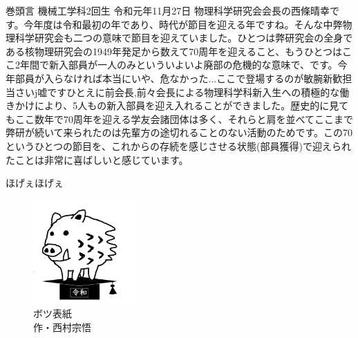 \documentclass[10pt,b5paper,papersize,dvipdfmx]{jsbook}
\begin{document}
\begin{preface}{巻頭言}
        {機械工学科2回生}
        {}
        {令和元年11月27日}
  物理科学研究会会長の西條晴幸です。今年度は令和最初の年であり、時代が節目を迎える年ですね。そんな中弊物理科学研究会も二つの意味で節目を迎えていました。ひとつは弊研究会の全身である核物理研究会の1949年発足から数えて70周年を迎えること、もうひとつはここ2年間で新入部員が一人のみといういよいよ廃部の危機的な意味で、です。今年部員が入らなければ本当にいや、危なかった...ここで登場するのが敏腕新歓担当さいj嘘ですひとえに前会長,前々会長による物理科学科新入生への積極的な働きかけにより、5人もの新入部員を迎え入れることができました。歴史的に見てもここ数年で70周年を迎える学友会諸団体は多く、それらと肩を並べてここまで弊研が続いて来られたのは先輩方の途切れることのない活動のためです。この70というひとつの節目を、これからの存続を感じさせる状態(部員獲得)で迎えられたことは非常に喜ばしいと感じています。\par
  ほげぇほげぇ
\end{preface}


\clearpage
\quad\vfill
\begin{figure}[htb]
  \centering
  \includegraphics[width=40mm]{img/inoshishi.png}
  \caption*{
    \setlength{\baselineskip}{1.2zw}\gtfamily
    ボツ表紙 \\ 作・西村宗悟
  }
  \label{}
\end{figure}
\vfill
\end{document}

